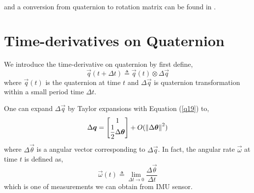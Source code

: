 and a conversion from quaternion to rotation matrix can be found in \cite{van2005quaternion}.

\section{Time-derivatives on Quaternion}
\label{sec:timed_on_quat}

We introduce the time-derivative on quaternion by first define,
\begin{equation}\label{q29}
	\vec{q}(t+\Delta t) \triangleq \vec{q}(t) \otimes \Delta\vec{q}
\end{equation}
where $\vec{q}(t)$ is the quaternion at time $t$ and $\Delta\vec{q}$ is quaternion transformation within a small period time $\Delta t$. 

One can expand $\Delta\vec{q}$ by Taylor expansions with Equation (\ref{q19}) to,
\begin{equation}\label{q30}
	\Delta\boldsymbol{q} = \begin{bmatrix} 1 \\ \dfrac{1}{2}\Delta{\boldsymbol{\theta}} \end{bmatrix} + O(\left\|\Delta{\boldsymbol{\theta}}\right\|^2)
\end{equation}
where $\Delta{\vec{\theta}}$ is a angular vector corresponding to $\Delta\vec{q}$. In fact, the angular rate $\vec{\omega}$ at time $t$ is defined as,
\begin{equation}\label{q31}
	\vec{\omega} (t) \triangleq \lim_{\Delta{t} \rightarrow 0}\dfrac{\Delta{\vec{\theta}}}{\Delta{t}}
\end{equation}
which is one of measurements we can obtain from IMU sensor.

